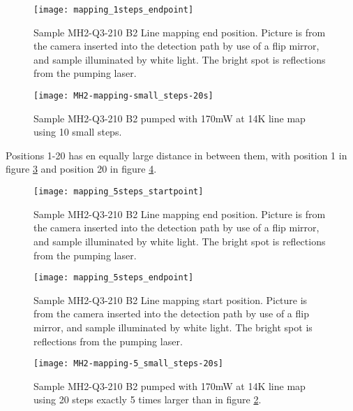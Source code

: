 \begin{figure}[H]
\centering
\texttt{[image: mapping\_1steps\_endpoint]}
\caption[MH2-Q3-210 line mapping end position]{Sample MH2-Q3-210 B2 Line mapping end position. Picture is from the camera inserted into the detection path by use of a flip mirror, and sample illuminated by white light. The bright spot is reflections from the pumping laser.}
\label{fig:mapping_1steps_endpoint}%
\end{figure}

\begin{figure}[H]
\centering
\texttt{[image: MH2-mapping-small\_steps-20s]}
\caption[MH2-Q3-210 line mapping]{Sample MH2-Q3-210 B2 pumped with 170mW at 14K line map using 10 small steps.}
\label{fig:MH2-mapping-small_steps-20s}%
\end{figure}



Positions 1-20 has en equally large distance in between them, with position 1 in figure \ref{fig:mapping_5steps_startpoint} and position 20 in figure \ref{fig:mapping_5steps_endpoint}.

\begin{figure}[H]
\centering
\texttt{[image: mapping\_5steps\_startpoint]}
\caption[MH2-Q3-210 line mapping start position]{Sample MH2-Q3-210 B2 Line mapping end position. Picture is from the camera inserted into the detection path by use of a flip mirror, and sample illuminated by white light. The bright spot is reflections from the pumping laser.}
\label{fig:mapping_5steps_startpoint}%
\end{figure}


\begin{figure}[H]
\centering
\texttt{[image: mapping\_5steps\_endpoint]}
\caption[MH2-Q3-210 line mapping start position]{Sample MH2-Q3-210 B2 Line mapping start position. Picture is from the camera inserted into the detection path by use of a flip mirror, and sample illuminated by white light. The bright spot is reflections from the pumping laser.}
\label{fig:mapping_5steps_endpoint}%
\end{figure}

\begin{figure}[H]
\centering
\texttt{[image: MH2-mapping-5\_small\_steps-20s]}
\caption[MH2-Q3-210 line mapping]{Sample MH2-Q3-210 B2 pumped with 170mW at 14K line map using 20 steps exactly 5 times larger than in figure \ref{fig:MH2-mapping-small_steps-20s}.}
\label{fig:MH2-mapping-5_small_steps-20s}%
\end{figure}


